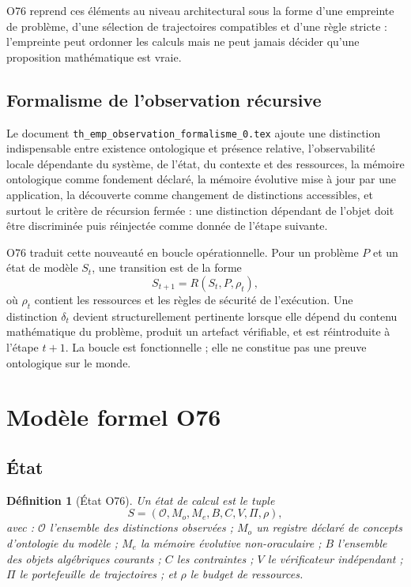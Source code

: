 \documentclass[11pt,a4paper]{article}
\newtheorem{definition}{Définition}[section]
\begin{document}
O76 reprend ces éléments au niveau architectural sous la forme d'une empreinte de problème, d'une sélection de trajectoires compatibles et d'une règle stricte : l'empreinte peut ordonner les calculs mais ne peut jamais décider qu'une proposition mathématique est vraie.

\subsection{Formalisme de l'observation récursive}
Le document \texttt{th\_emp\_observation\_formalisme\_0.tex} ajoute une distinction indispensable entre existence ontologique et présence relative, l'observabilité locale dépendante du système, de l'état, du contexte et des ressources, la mémoire ontologique comme fondement déclaré, la mémoire évolutive mise à jour par une application, la découverte comme changement de distinctions accessibles, et surtout le critère de récursion fermée : une distinction dépendant de l'objet doit être discriminée puis réinjectée comme donnée de l'étape suivante.

O76 traduit cette nouveauté en boucle opérationnelle. Pour un problème $P$ et un état de modèle $S_t$, une transition est de la forme
\[
S_{t+1}=R(S_t,P,\rho_t),
\]
où $\rho_t$ contient les ressources et les règles de sécurité de l'exécution. Une distinction $\delta_t$ devient structurellement pertinente lorsque elle dépend du contenu mathématique du problème, produit un artefact vérifiable, et est réintroduite à l'étape $t+1$. La boucle est fonctionnelle ; elle ne constitue pas une preuve ontologique sur le monde.

\section{Modèle formel O76}
\subsection{État}
\begin{definition}[État O76]
Un état de calcul est le tuple
\[
S=(\mathcal O,M_o,M_e,B,C,V,\Pi,\rho),
\]
avec : $\mathcal O$ l'ensemble des distinctions observées ; $M_o$ un registre déclaré de concepts d'ontologie du modèle ; $M_e$ la mémoire évolutive non-oraculaire ; $B$ l'ensemble des objets algébriques courants ; $C$ les contraintes ; $V$ le vérificateur indépendant ; $\Pi$ le portefeuille de trajectoires ; et $\rho$ le budget de ressources.
\end{definition}
\end{document}

